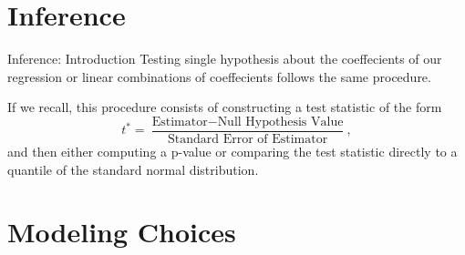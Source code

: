 \documentclass[notheorems,9pt]{beamer}
\begin{document}

\section{Inference}
\begin{frame}{Inference: Introduction} 
	\label{frame:inference-mhs}
	Testing single hypothesis about the coeffecients of our regression or linear combinations of coeffecients follows the same procedure.

	If we recall, this procedure consists of constructing a test statistic of the form 
	\[
		t^* = \frac{\text{Estimator} - \text{Null Hypothesis Value}}{\text{Standard Error of Estimator}} 
	,\] 
	and then either computing a p-value or comparing the test statistic directly to a quantile of the standard normal distribution.
\end{frame}


\section{Modeling Choices}
\end{document}
